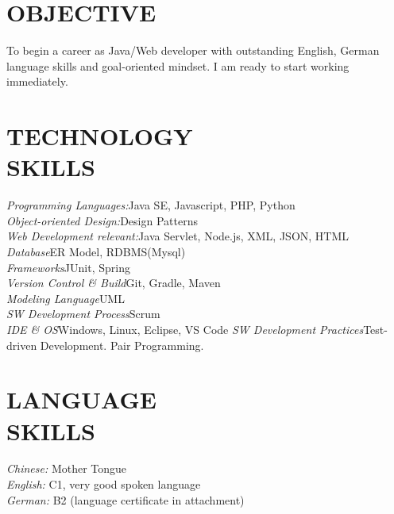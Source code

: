 \documentclass[margin, 10pt]{res} %
\begin{document}
\begin{resume}

 
\section{OBJECTIVE}  

To begin a career as Java/Web developer with outstanding English, German language skills and goal-oriented mindset. I am ready to start working immediately.

\section{TECHNOLOGY \\ SKILLS} 

{\sl Programming Languages:}\hfill		Java SE, Javascript, PHP, Python\\
{\sl Object-oriented Design:}\hfill 		Design Patterns\\
{\sl Web Development relevant:}\hfill 	Java Servlet, Node.js, XML, JSON, HTML\\
{\sl Database}\hfill 						ER Model, RDBMS(Mysql)\\ 
{\sl Frameworks}\hfill  					JUnit, Spring\\
{\sl Version Control \& Build}\hfill 	Git, Gradle, Maven\\
{\sl Modeling Language}\hfill 				UML\\
{\sl SW Development Process}\hfill 		Scrum\\
{\sl IDE \& OS}\hfill  					Windows, Linux, Eclipse, VS Code
{\sl SW Development Practices}\hfill	Test-driven Development. Pair Programming.



\section{LANGUAGE \\ SKILLS} 
{\sl Chinese:} 		Mother Tongue \\
{\sl English:} 		C1, very good spoken language\\
{\sl German:} 		B2 (language certificate in attachment)


\end{resume}
\end{document}
